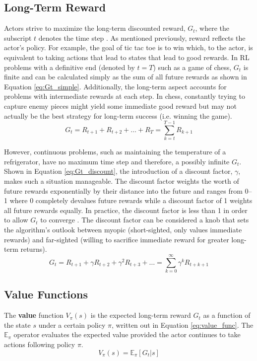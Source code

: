 \subsection{Long-Term Reward}
Actors strive to maximize the long-term discounted reward, $G_t$, where the subscript $t$ denotes the time step \cite{sutton_2017}. As mentioned previously, reward reflects the actor's policy. For example, the goal of tic tac toe is to win which, to the actor, is equivalent to taking actions that lead to states that lead to good rewards. In RL problems with a definitive end (denoted by $t=T$) such as a game of chess, $G_t$ is finite and can be calculated simply as the sum of all future rewards as shown in Equation \ref{eq:Gt_simple}. Additionally, the long-term aspect accounts for problems with intermediate rewards at each step. In chess, constantly trying to capture enemy pieces might yield some immediate good reward but may not actually be the best strategy for long-term success (i.e. winning the game).
\begin{equation}
	\label{eq:Gt_simple}
	G_t=R_{t+1}+R_{t+2}+\dots + R_{T}=\sum_{k=t}^{T-1} R_{k+1}
\end{equation}

However, continuous problems, such as maintaining the temperature of a refrigerator, have no maximum time step and therefore, a possibly infinite $G_t$. Shown in Equation \ref{eq:Gt_discount}, the introduction of a discount factor, $\gamma$, makes such a situation manageable. The discount factor weights the worth of future rewards exponentially by their distance into the future and ranges from 0--1 where 0 completely devalues future rewards while a discount factor of 1 weights all future rewards equally. In practice, the discount factor is less than 1 in order to allow $G_t$ to converge \cite{sutton_2017}. The discount factor can be considered a knob that sets the algorithm's outlook between myopic (short-sighted, only values immediate rewards) and far-sighted (willing to sacrifice immediate reward for greater long-term returns).
\begin{equation}
\label{eq:Gt_discount}
	G_t=R_{t+1}+\gamma R_{t+2}+\gamma^2 R_{t+3} + \dots = \sum_{k=0}^{\infty} \gamma^k R_{t+k+1}
\end{equation}

\subsection{Value Functions}
The \textbf{value} function $V_\pi(s)$ is the expected long-term reward $G_t$ as a function of the state $s$ under a certain policy $\pi$, written out in Equation \ref{eq:value_func}. The $\mathbb{E}_\pi$ operator evaluates the expected value provided the actor continues to take actions following policy $\pi$.
\begin{equation}
	\label{eq:value_func}
	V_\pi(s)=\mathbb{E}_\pi [G_t | s]
\end{equation}

